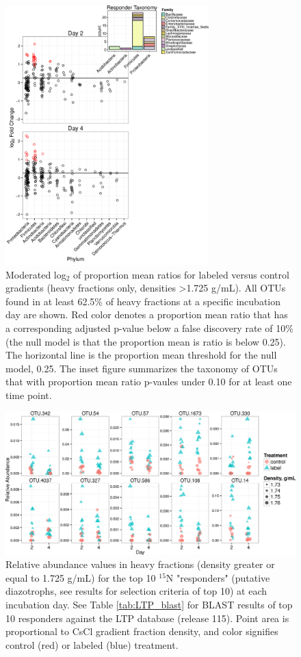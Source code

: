\begin{figure}[h!]
  \centering
    \includegraphics[width=0.7\textwidth]{figures/l2fc1/l2fc_stacked_w_inset.png}
  \caption{Moderated log$_{2}$ of proportion mean ratios for labeled versus control gradients (heavy fractions only, densities >1.725 g/mL). All OTUs found in at least 62.5\% of heavy fractions at a specific incubation day are shown. Red color denotes a proportion mean ratio that has a corresponding adjusted p-value below a false discovery rate of 10\% (the null model is that the proportion mean is ratio is below 0.25). The horizontal line is the proportion mean threshold for the null model, 0.25. The inset figure summarizes the taxonomy of OTUs that with proportion mean ratio p-vaules under 0.10 for at least one time point.}
  \label{fig:l2fc}
\end{figure}

\begin{figure}[h!]
  \centering
    \includegraphics[width=1.0\textwidth]{figures/scatter_heavy_topN2/scatter_heavy_topN.png}
    \caption{Relative abundance values in heavy fractions (density greater or equal to 1.725 g/mL) for the top 10 $^{15}$N "responders" (putative diazotrophs, see results for selection criteria of top 10) at each incubation day. See Table \ref{tab:LTP_blast} for BLAST results of top 10 responders against the LTP database (release 115). Point area is proportional to CsCl gradient fraction density, and color signifies control (red) or labeled (blue) treatment.}
  \label{fig:scatter_heavy}
\end{figure}

